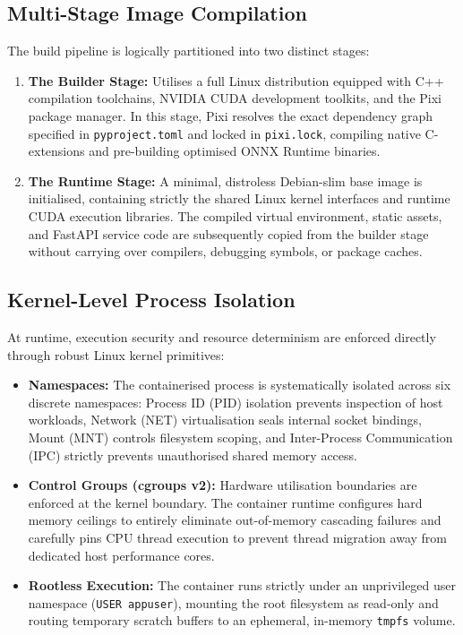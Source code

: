 \subsection{Multi-Stage Image Compilation}
The build pipeline is logically partitioned into two distinct stages:
\begin{enumerate}
    \item \textbf{The Builder Stage:} Utilises a full Linux distribution equipped with C++ compilation toolchains, NVIDIA CUDA development toolkits, and the Pixi package manager. In this stage, Pixi resolves the exact dependency graph specified in \texttt{pyproject.toml} and locked in \texttt{pixi.lock}, compiling native C-extensions and pre-building optimised ONNX Runtime binaries.
    \item \textbf{The Runtime Stage:} A minimal, distroless Debian-slim base image is initialised, containing strictly the shared Linux kernel interfaces and runtime CUDA execution libraries. The compiled virtual environment, static assets, and FastAPI service code are subsequently copied from the builder stage without carrying over compilers, debugging symbols, or package caches.
\end{enumerate}

\subsection{Kernel-Level Process Isolation}
At runtime, execution security and resource determinism are enforced directly through robust Linux kernel primitives:
\begin{itemize}
    \item \textbf{Namespaces:} The containerised process is systematically isolated across six discrete namespaces: Process ID (PID) isolation prevents inspection of host workloads, Network (NET) virtualisation seals internal socket bindings, Mount (MNT) controls filesystem scoping, and Inter-Process Communication (IPC) strictly prevents unauthorised shared memory access.
    \item \textbf{Control Groups (cgroups v2):} Hardware utilisation boundaries are enforced at the kernel boundary. The container runtime configures hard memory ceilings to entirely eliminate out-of-memory cascading failures and carefully pins CPU thread execution to prevent thread migration away from dedicated host performance cores.
    \item \textbf{Rootless Execution:} The container runs strictly under an unprivileged user namespace (\texttt{USER appuser}), mounting the root filesystem as read-only and routing temporary scratch buffers to an ephemeral, in-memory \texttt{tmpfs} volume.
\end{itemize}


